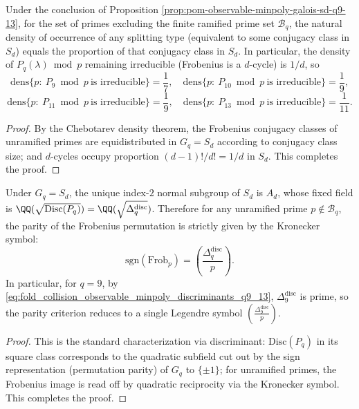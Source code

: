 \begin{corollary}\label{cor:pom-observable-minpoly-chebotarev-density-q9-13}
Under the conclusion of Proposition \ref{prop:pom-observable-minpoly-galois-sd-q9-13}, for the set of primes excluding the finite ramified prime set \(\mathcal{B}_q\), the natural density of occurrence of any splitting type (equivalent to some conjugacy class in \(S_d\)) equals the proportion of that conjugacy class in \(S_d\).
In particular, the density of \(P_q(\lambda)\bmod p\) remaining irreducible (Frobenius is a \(d\)-cycle) is \(1/d\), so
\[
\mathrm{dens}\{p:\ P_9\bmod p\ \text{is irreducible}\}=\frac17,\quad
\mathrm{dens}\{p:\ P_{10}\bmod p\ \text{is irreducible}\}=\frac19,
\]
\[
\mathrm{dens}\{p:\ P_{11}\bmod p\ \text{is irreducible}\}=\frac19,\quad
\mathrm{dens}\{p:\ P_{13}\bmod p\ \text{is irreducible}\}=\frac1{11}.
\]
\end{corollary}
\begin{proof}
By the Chebotarev density theorem, the Frobenius conjugacy classes of unramified primes are equidistributed in \(G_q=S_d\) according to conjugacy class size; and \(d\)-cycles occupy proportion \((d-1)!/d!=1/d\) in \(S_d\). This completes the proof.
\end{proof}

\begin{corollary}\label{cor:pom-observable-minpoly-frob-parity-q9-13}
Under \(G_q=S_d\), the unique index-\(2\) normal subgroup of \(S_d\) is \(A_d\), whose fixed field is \(\QQ(\sqrt{\mathrm{Disc}(P_q)})=\QQ(\sqrt{\Delta_q^{\mathrm{disc}}})\).
Therefore for any unramified prime \(p\notin\mathcal{B}_q\), the parity of the Frobenius permutation is strictly given by the Kronecker symbol:
\[
\mathrm{sgn}(\mathrm{Frob}_p)=\left(\frac{\Delta_q^{\mathrm{disc}}}{p}\right).
\]
In particular, for \(q=9\), by \eqref{eq:fold_collision_observable_minpoly_discriminants_q9_13}, \(\Delta_9^{\mathrm{disc}}\) is prime, so the parity criterion reduces to a single Legendre symbol \(\left(\frac{\Delta_9^{\mathrm{disc}}}{p}\right)\).
\end{corollary}
\begin{proof}
This is the standard characterization via discriminant: \(\mathrm{Disc}(P_q)\) in its square class corresponds to the quadratic subfield cut out by the sign representation (permutation parity) of \(G_q\) to \(\{\pm 1\}\); for unramified primes, the Frobenius image is read off by quadratic reciprocity via the Kronecker symbol. This completes the proof.
\end{proof}

